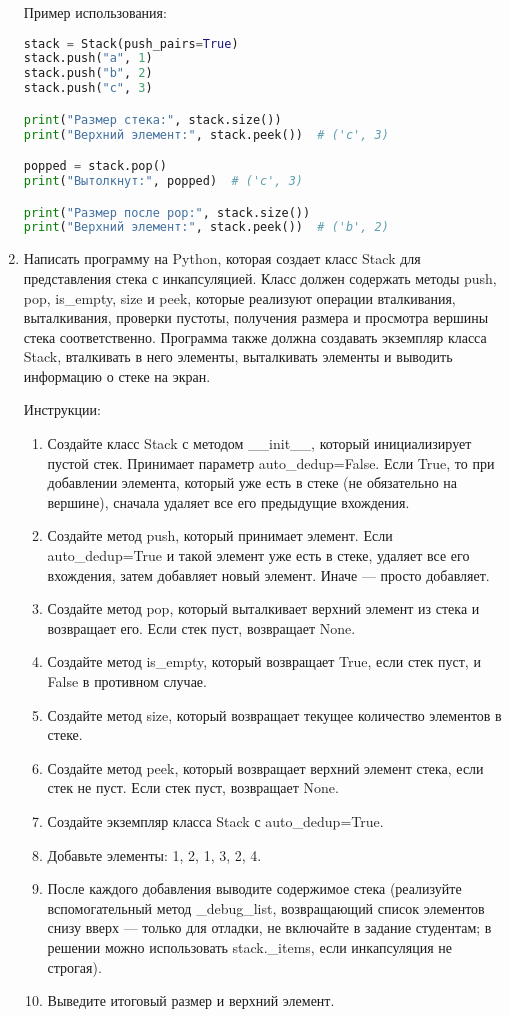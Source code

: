 \begin{enumerate}
Пример использования:
\begin{lstlisting}[language=Python]
stack = Stack(push_pairs=True)
stack.push("a", 1)
stack.push("b", 2)
stack.push("c", 3)

print("Размер стека:", stack.size())
print("Верхний элемент:", stack.peek())  # ('c', 3)

popped = stack.pop()
print("Вытолкнут:", popped)  # ('c', 3)

print("Размер после pop:", stack.size())
print("Верхний элемент:", stack.peek())  # ('b', 2)
\end{lstlisting}

\item Написать программу на Python, которая создает класс Stack для представления стека с инкапсуляцией. Класс должен содержать методы push, pop, is\_empty, size и peek, которые реализуют операции вталкивания, выталкивания, проверки пустоты, получения размера и просмотра вершины стека соответственно. Программа также должна создавать экземпляр класса Stack, вталкивать в него элементы, выталкивать элементы и выводить информацию о стеке на экран.

Инструкции:
\begin{enumerate}
    \item Создайте класс Stack с методом \_\_init\_\_, который инициализирует пустой стек. Принимает параметр auto\_dedup=False. Если True, то при добавлении элемента, который уже есть в стеке (не обязательно на вершине), сначала удаляет все его предыдущие вхождения.
    \item Создайте метод push, который принимает элемент. Если auto\_dedup=True и такой элемент уже есть в стеке, удаляет все его вхождения, затем добавляет новый элемент. Иначе — просто добавляет.
    \item Создайте метод pop, который выталкивает верхний элемент из стека и возвращает его. Если стек пуст, возвращает None.
    \item Создайте метод is\_empty, который возвращает True, если стек пуст, и False в противном случае.
    \item Создайте метод size, который возвращает текущее количество элементов в стеке.
    \item Создайте метод peek, который возвращает верхний элемент стека, если стек не пуст. Если стек пуст, возвращает None.
    \item Создайте экземпляр класса Stack с auto\_dedup=True.
    \item Добавьте элементы: 1, 2, 1, 3, 2, 4.
    \item После каждого добавления выводите содержимое стека (реализуйте вспомогательный метод \_debug\_list, возвращающий список элементов снизу вверх — только для отладки, не включайте в задание студентам; в решении можно использовать stack.\_items, если инкапсуляция не строгая).
    \item Выведите итоговый размер и верхний элемент.
\end{enumerate}


\end{enumerate}
